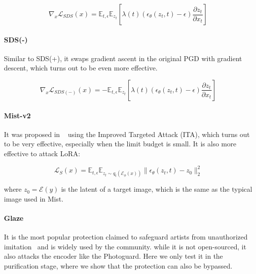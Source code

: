\begin{equation}\label{sds_equation}
    \nabla_{x}\mathcal{L}_{SDS}(x) =  \mathbb{E}_{t, \epsilon}\mathbb{E}_{z_t} \left[\lambda(t) (\epsilon_{\theta}(z_t, t) -\epsilon)\frac{\partial z_t}{\partial x_t}\right]
\end{equation}

\paragraph{SDS(-)} Similar to SDS(+), it swaps gradient ascent in the original PGD with gradient descent, which turns out to be even more effective.

\begin{equation}\label{sds_equation}
    \nabla_{x}\mathcal{L}_{SDS(-)}(x) = -\mathbb{E}_{t, \epsilon}\mathbb{E}_{z_t} \left[\lambda(t) (\epsilon_{\theta}(z_t, t) -\epsilon)\frac{\partial z_t}{\partial x_t}\right]
\end{equation}



\paragraph{Mist-v2} It was proposed in ~\cite{mist-v2} using the Improved Targeted Attack (ITA), which turns out to be very effective, especially when the limit budget is small. It is also more effective to attack LoRA:

\begin{equation}
     \mathcal{L}_{S}(x) = \mathbb{E}_{t, \epsilon} \mathbb{E}_{z_t \sim q_t(\mathcal{E}_{\phi}(x))}\|\epsilon_{\theta}(z_t, t) -z_0 \|_2^2
\end{equation}

where $z_0 = \mathcal{E}(y)$ is the latent of a target image, which is the same as the typical image used in Mist.

\paragraph{Glaze} It is the most popular protection claimed to safeguard artists from unauthorized imitation~
\cite{glaze} and is widely used by the community. while it is not open-sourced, it also attacks the encoder like the Photoguard. Here we only test it in the purification stage, where we show that the protection can also be bypassed.


